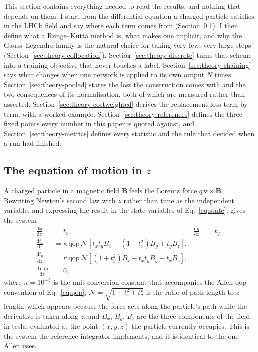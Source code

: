 \documentclass[11pt,a4paper]{article}
\newcommand{\qop}{\ensuremath{\mathrm{qop}}}
\begin{document}
This section contains everything needed to read the results, and nothing that
depends on them. I start from the differential equation a charged particle
satisfies in the LHCb field and say where each term comes from
(Section~\ref{sec:theory-eom}). I then define what a Runge--Kutta method is,
what makes one implicit, and why the Gauss--Legendre family is the natural
choice for taking very few, very large steps
(Section~\ref{sec:theory-collocation}). Section~\ref{sec:theory-discrete}
turns that scheme into a training objective that never touches a label.
Section~\ref{sec:theory-chaining} says what changes when one network is applied
to its own output $N$ times. Section~\ref{sec:theory-pooled} states the loss
the construction comes with and the two consequences of its normalisation,
both of which are measured rather than asserted.
Section~\ref{sec:theory-costweighted} derives the replacement loss term by
term, with a worked example. Section~\ref{sec:theory-references} defines the
three fixed points every number in this paper is quoted against, and
Section~\ref{sec:theory-metrics} defines every statistic and the rule that
decided when a run had finished.

\subsection{The equation of motion in \texorpdfstring{$z$}{z}}
\label{sec:theory-eom}

A charged particle in a magnetic field $\mathbf{B}$ feels the Lorentz force
$q\,\mathbf{v} \times \mathbf{B}$. Rewriting Newton's second law with $z$
rather than time as the independent variable, and expressing the result in the
state variables of Eq.~\eqref{eq:state}, gives the system
%
\begin{align}
  \frac{\mathrm{d}x}{\mathrm{d}z} &= t_x,
  &\frac{\mathrm{d}y}{\mathrm{d}z} &= t_y,
  \label{eq:eom1}\\[4pt]
  \frac{\mathrm{d}t_x}{\mathrm{d}z}
    &= \kappa\,\qop\,\mathcal{N}
       \left[t_x t_y B_x - (1 + t_x^2) B_y + t_y B_z\right],
  \label{eq:eom2}\\[2pt]
  \frac{\mathrm{d}t_y}{\mathrm{d}z}
    &= \kappa\,\qop\,\mathcal{N}
       \left[(1 + t_y^2) B_x - t_x t_y B_y - t_x B_z\right],
  \label{eq:eom3}\\[2pt]
  \frac{\mathrm{d}\,\qop}{\mathrm{d}z} &= 0,
  \label{eq:eom4}
\end{align}
%
where $\kappa = 10^{-3}$ is the unit conversion constant that accompanies the
Allen $\qop$ convention of Eq.~\eqref{eq:qop};
$\mathcal{N} = \sqrt{1 + t_x^2 + t_y^2}$ is the ratio of path length to
$z$ length, which appears because the force acts along the particle's path
while the derivative is taken along $z$; and $B_x$, $B_y$, $B_z$ are the three
components of the field in tesla, evaluated at the point $(x, y, z)$ the
particle currently occupies. This is the system the reference integrator
implements, and it is identical to the one Allen uses.
\end{document}
